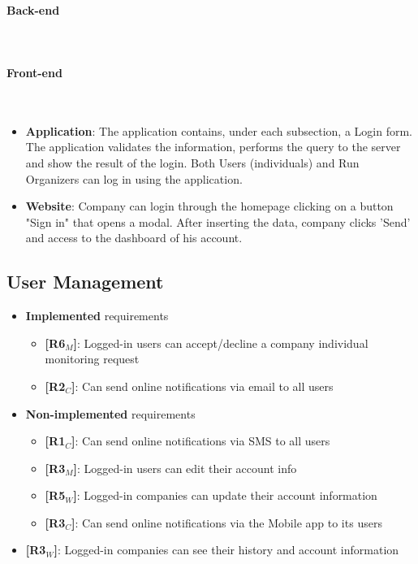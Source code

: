 \paragraph{Back-end} \mbox{}\\ 

\paragraph{Front-end} \mbox{}\\

\begin{itemize}
    \item \textbf{Application}: The application contains, under each subsection, a Login form. The application validates the information, performs the query to the server and show the result of the login. Both Users (individuals) and Run Organizers can log in using the application.
    \item \textbf{Website}: Company can login through the homepage clicking on a button "Sign in" that opens a modal. After inserting the data, company clicks 'Send' and access to the dashboard of his account.
\end{itemize}

\subsection{User Management}


   


\begin{itemize}
    \item \textbf{Implemented} requirements
        \begin{itemize}
      
    \item \textbf{[R6$_M$]}: Logged-in users can accept/decline a company individual monitoring request
   
    \item \textbf{[R2$_C$]}: Can send online notifications via email to all users
    

        \end{itemize}
    \item \textbf{Non-implemented} requirements
    \begin{itemize}
    
    
    \item \textbf{[R1$_C$]}: Can send online notifications via SMS to all users 
    \item \textbf{[R3$_M$]}: Logged-in users can edit their account info
    \item \textbf{[R5$_W$]}: Logged-in companies can update their account information
    \item \textbf{[R3$_C$]}: Can send online notifications via the Mobile app to its users
        \end{itemize}
    \item \textbf{[R3$_W$]}: Logged-in companies can see their history and account information
        
\end{itemize}

